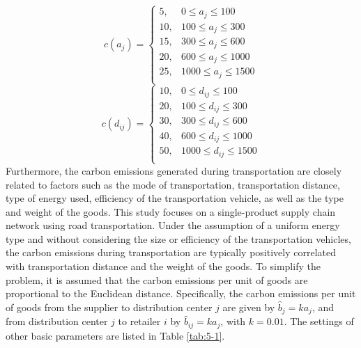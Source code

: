 \documentclass[]{article}
\theoremstyle{plain}%
\theoremstyle{definition}
\theoremstyle{remark}
\theoremstyle{plain}%
\begin{document}
    \begin{equation}
    \label{eq:5-1}
        c(a_j) = 
    \begin{cases}
    5, & 0 \leq a_j \leq 100 \\
    10, & 100 \leq a_j \leq 300 \\
    15, & 300 \leq a_j \leq 600 \\
    20, & 600 \leq a_j \leq 1000 \\
    25, & 1000 \leq a_j \leq 1500 \\
    \end{cases}
    \end{equation}
    \begin{equation}
    \label{eq:5-2}
        c(d_{ij}) = 
    \begin{cases}
    10, & 0 \leq d_{ij} \leq 100 \\
    20, & 100 \leq d_{ij} \leq 300 \\
    30, & 300 \leq d_{ij} \leq 600 \\
    40, & 600 \leq d_{ij} \leq 1000 \\
    50, & 1000 \leq d_{ij} \leq 1500 \\
    \end{cases}
    \end{equation}
    Furthermore, the carbon emissions generated during transportation are closely related to factors such as the mode of transportation, transportation distance, type of energy used, efficiency of the transportation vehicle, as well as the type and weight of the goods. This study focuses on a single-product supply chain network using road transportation. Under the assumption of a uniform energy type and without considering the size or efficiency of the transportation vehicles, the carbon emissions during transportation are typically positively correlated with transportation distance and the weight of the goods. To simplify the problem, it is assumed that the carbon emissions per unit of goods are proportional to the Euclidean distance. Specifically, the carbon emissions per unit of goods from the supplier to distribution center $j$ are given by $\hat{b}_j=ka_j$, and from distribution center $j$ to retailer $i$ by $\hat{b}_{ij}=ka_j$, with $k=0.01$. The settings of other basic parameters are listed in Table \ref{tab:5-1}.
    
\end{document}
